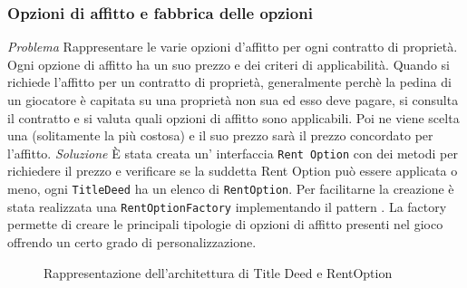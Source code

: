 \subsubsection{Opzioni di affitto e fabbrica delle opzioni}
\emph{Problema}\newline
Rappresentare le varie opzioni d'affitto per ogni contratto di proprietà. Ogni
opzione di affitto ha un suo prezzo e dei criteri di applicabilità. 
Quando si richiede l’affitto per un contratto di proprietà, generalmente perchè
la pedina di un giocatore è capitata su una proprietà non sua ed esso deve pagare,
si consulta il contratto e si valuta quali opzioni di affitto sono applicabili.
Poi ne viene scelta una (solitamente la più costosa)
e il suo prezzo sarà il prezzo concordato per l'affitto.\newline
\emph{Soluzione}\newline
È stata creata un' interfaccia \texttt{Rent Option} 
con dei metodi per richiedere il prezzo e verificare se la suddetta Rent Option può essere applicata o meno, 
ogni \texttt{TitleDeed} ha un elenco di \texttt{RentOption}.\newline
Per facilitarne la creazione è stata realizzata una 
\texttt{RentOptionFactory} implementando il pattern . 
La factory permette di creare le principali tipologie di opzioni di affitto presenti nel gioco 
offrendo un certo grado di personalizzazione.\newline
\begin{figure}[H]
    \centering
    \caption{Rappresentazione dell'architettura di Title Deed e RentOption}
	\label{img:RentOption}
\end{figure}
